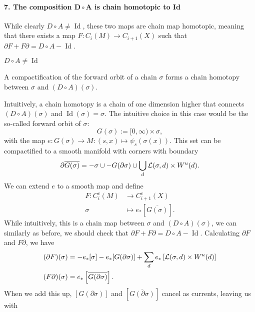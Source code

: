 \begin{myproof}
\paragraph{7. The composition $\bm{D  \circ A}$ is chain homotopic to Id}
While clearly $D  \circ  A \neq \operatorname{Id}$, these two maps are chain map homotopic, meaning that there exists a map $F: C_i(M) \to  C_{i+1}(X)$ such that $\partial F + F \partial = D  \circ  A - \operatorname{Id}$.
\begin{marginfigure}
    \centering
    \caption{$D  \circ  A \neq  \operatorname{Id}$}
    \label{fig:d-na-a-is-not-identity}
\end{marginfigure}
\begin{marginfigure}
    \centering
    \caption{A compactification of the forward orbit of a chain $\sigma$ forms a chain homotopy between $\sigma$ and  $(D  \circ  A)(\sigma)$.}
    \label{fig:chain-homotopy-between-d-na-a-and-id}
\end{marginfigure}
Intuitively, a chain homotopy is a chain of one dimension higher that connects $(D  \circ  A)(\sigma)$ and $\operatorname{Id} (\sigma) = \sigma$.
The intuitive choice in this case would be the so-called forward orbit of $\sigma$:
\[
    G(\sigma) := [0, \infty) \times \sigma
,\] with the map $e: G(\sigma) \to  M: (s, x) \mapsto \psi_s (\sigma(x))$.
This set can be compactified to a smooth manifold with corners with boundary
\[
    \partial \overline{G(\sigma)} = - \sigma \cup - G(\partial \sigma) \cup \bigcup_{d}  \mathcal L(\sigma, d) \times W^u(d)
.\] 
We can extend $e$ to a smooth map and define 
\begin{align*}
    F: C_i^{c}(M) &\longrightarrow C_{i+1}^{c}(X) \\
    \sigma &\longmapsto e_* \left[ \overline{G(\sigma)} \right] 
.\end{align*}
While intuitively, this is a chain map between $\sigma$ and  $(D  \circ A)(\sigma)$, we can similarly as before, we should check that $\partial F + F \partial = D  \circ  A - \operatorname{Id}$.
Calculating $\partial F$ and  $F \partial$, we have
\begin{align*}
    (\partial F)(\sigma) &= -e_*[\sigma] - e_*[G(\partial \sigma)] + \sum_{d} e_*\left[\mathcal L(\sigma, d) \times W^u(d)\right]\\
    (F \partial)(\sigma) &= e_*\left[\overline{G(\partial \sigma)}\right]
    .\end{align*}
    When we add this up, $[G (\partial \sigma)]$ and $\left[ \overline{G(\partial \sigma)} \right]$ cancel as currents, leaving us with


\end{myproof}

